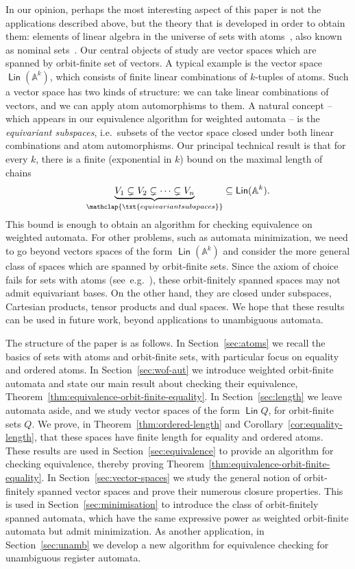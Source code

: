 \documentclass{theoretics}
\newcommand{\myunderbrace}[2]{\underbrace{#1}_{\mathclap{\txt{\scriptsize #2}}}}
\newcommand{\atoms}{\mathbb A}
\DeclareMathOperator{\lin}{\mathsf{Lin}}
\begin{document}
In our opinion, perhaps the most interesting aspect of this paper is not the applications described above, but the theory that is developed in order to obtain them: elements of linear algebra in the universe of sets with atoms~\cite{bojanczyk_slightly2018}, also known as nominal sets~\cite{pitts}.
Our central objects of study are vector spaces which are spanned by orbit-finite set of vectors. A typical example is the vector space $\lin (\atoms^k)$,  which consists of finite linear combinations of $k$-tuples of atoms. Such a vector space has two kinds of structure: we can take linear combinations of vectors, and we can apply atom automorphisms to them.  A natural concept -- which appears  in our equivalence algorithm for weighted automata -- is the  \emph{equivariant subspaces}, i.e.~subsets of the vector space  closed under both linear combinations and atom automorphisms. Our principal technical result is that for every $k$, there is a finite (exponential in $k$) bound on the maximal length of chains
\begin{align*}
\myunderbrace{V_1 \subsetneq V_2 \subsetneq \cdots \subsetneq V_n}{equivariant subspaces} \subseteq \lin (\atoms^k).
\end{align*}
This bound is enough to obtain an algorithm for checking equivalence on weighted automata. For other problems, such as automata minimization, we need to go beyond vectors spaces of the form $\lin (\atoms^k)$ and consider the more general class of spaces which are spanned by orbit-finite sets. Since the axiom of choice fails for sets with atoms (see~e.g.~\cite[Sec.~2.7]{pitts}), these orbit-finitely spanned spaces may not admit equivariant bases. On the other hand, they are closed under subspaces, Cartesian products, tensor products and dual spaces. We hope that these results can be used in future work, beyond applications to unambiguous automata. 

The structure of the paper is as follows. In Section~\ref{sec:atoms} we recall the basics of sets with atoms and orbit-finite sets, with particular focus on equality and ordered atoms. In Section~\ref{sec:wof-aut} we introduce weighted orbit-finite automata and state our main result about checking their equivalence, Theorem~\ref{thm:equivalence-orbit-finite-equality}. In Section~\ref{sec:length} we leave automata aside, and we study vector spaces of the form $\lin Q$, for orbit-finite sets $Q$. We prove, in Theorem~\ref{thm:ordered-length} and Corollary~\ref{cor:equality-length}, that these spaces have finite length for equality and ordered atoms. These results are used in Section~\ref{sec:equivalence} to provide an algorithm for checking equivalence, thereby proving Theorem~\ref{thm:equivalence-orbit-finite-equality}. In Section~\ref{sec:vector-spaces} we study the general notion of orbit-finitely spanned vector spaces and prove their numerous closure properties. This is used in Section~\ref{sec:minimisation} to introduce the class of orbit-finitely spanned automata, which have the same expressive power as weighted orbit-finite automata but admit minimization. As another application, in Section~\ref{sec:unamb} we develop a new algorithm for equivalence checking for unambiguous register automata.
\end{document}
